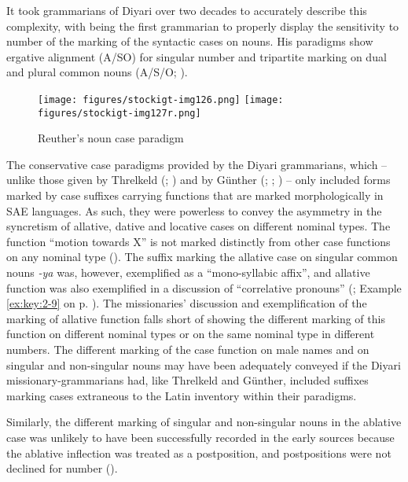 It took grammarians of Diyari over two decades to accurately describe this complexity, with \citet{reuther_dieri_1894} being the first grammarian to properly display the sensitivity to number of the marking of the syntactic cases on nouns. His paradigms show ergative alignment (A/SO) for singular number and tripartite marking on dual and plural common nouns (A/S/O; ).


\begin{figure}
\texttt{[image: figures/stockigt-img126.png]}
\texttt{[image: figures/stockigt-img127r.png]}
\caption{Reuther’s noun case paradigm \citeyearpar[5--6]{reuther_dieri_1894}}
\label{bkm:Ref449369326}\label{fig:key:8-178}
\end{figure}

The conservative case paradigms provided by the Diyari grammarians, which -- unlike those given by Threlkeld (\citeyear{threlkeld_australian_1834}; ) and by Günther (\citeyear{gunther_native_1838}; \citeyear{gunther_lecture_1840}; ) -- only included forms marked by case suffixes carrying functions that are marked morphologically in SAE languages. As such, they were powerless to convey the asymmetry in the syncretism of allative, dative and locative cases on different nominal types. The function “motion towards X” is not marked distinctly from other case functions on any nominal type (). The suffix marking the allative case on singular common nouns \textit{-ya} was, however, exemplified as a ``mono-syllabic affix'', and allative function was also exemplified in a discussion of “correlative pronouns” (; Example \ref{ex:key:2-9} on p. \pageref{ex:key:2-9}). The missionaries' discussion and exemplification of the marking of allative function falls short of showing the different marking of this function on different nominal types or on the same nominal type in different numbers. The different marking of the case function on male names and on singular and non-singular nouns may have been adequately conveyed if the Diyari missionary-grammarians had, like Threlkeld and Günther, included suffixes marking cases extraneous to the Latin inventory within their paradigms.

Similarly, the different marking of singular and non-singular nouns in the ablative case was unlikely to have been successfully recorded in the early sources because the ablative inflection was treated as a postposition, and postpositions were not declined for number ().

